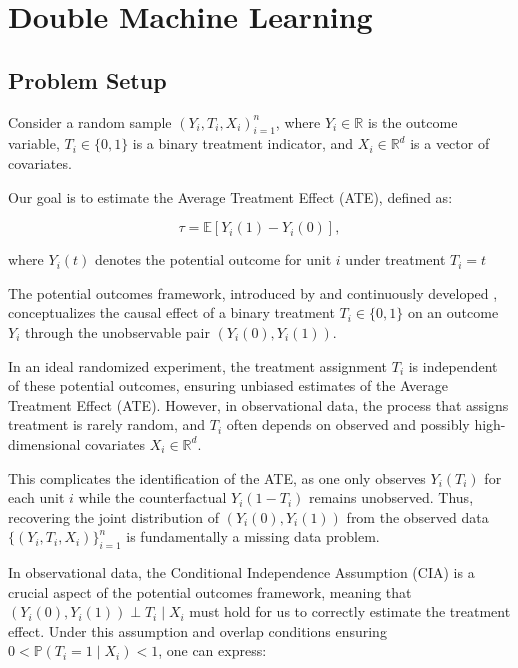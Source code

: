 \documentclass{article}
\numberwithin{equation}{section}
\begin{document}
\section{Double Machine Learning}

\subsection{Problem Setup}

Consider a random sample ${(Y_i, T_i, X_i)}_{i=1}^n$, where $Y_i \in \mathbb{R}$ is the outcome variable, $T_i \in \{0,1\}$ is a binary treatment indicator, and $X_i \in \mathbb{R}^d$ is a vector of covariates.

Our goal is to estimate the Average Treatment Effect (ATE), defined as:

\begin{equation}
\tau = \mathbb{E}[Y_i(1) - Y_i(0)],
\label{eq:tau_hat_potential_outcome}
\end{equation}

where $Y_i(t)$ denotes the potential outcome for unit $i$ under treatment $T_i = t$

The potential outcomes framework, introduced by \cite{Rubin1974} and continuously developed \cite{ImbensRubin2015}, conceptualizes the causal effect of a binary treatment \(T_i \in \{0,1\}\) on an outcome \(Y_i\) through the unobservable pair \((Y_i(0), Y_i(1))\).

In an ideal randomized experiment, the treatment assignment \(T_i\) is independent of these potential outcomes, ensuring unbiased estimates of the Average Treatment Effect (ATE). However, in observational data, the process that assigns treatment is rarely random, and \(T_i\) often depends on observed and possibly high-dimensional covariates \(X_i \in \mathbb{R}^d\).

This complicates the identification of the ATE, as one only observes \(Y_i(T_i)\) for each unit \(i\) while the counterfactual \(Y_i(1-T_i)\) remains unobserved. Thus, recovering the joint distribution of \((Y_i(0), Y_i(1))\) from the observed data \(\{(Y_i, T_i, X_i)\}_{i=1}^n\) is fundamentally a missing data problem.

In observational data, the Conditional Independence Assumption (CIA) is a crucial aspect of the potential outcomes framework, meaning that \((Y_i(0), Y_i(1)) \perp T_i \mid X_i\) must hold for us to correctly estimate the treatment effect. Under this assumption and overlap conditions ensuring \(0 < \mathbb{P}(T_i=1 \mid X_i) < 1\), one can express:
\end{document}
